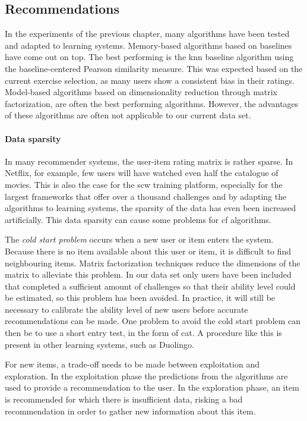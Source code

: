 \subsection{Recommendations}

In the experiments of the previous chapter, many algorithms have been tested and adapted to learning systems.
Memory-based algorithms based on baselines have come out on top.
The best performing is the \gls{knn} baseline algorithm using the baseline-centered Pearson similarity measure.
This was expected based on the current exercise selection, as many users show a consistent bias in their ratings.
Model-based algorithms based on dimensionality reduction through matrix factorization, are often the best performing algorithms.
However, the advantages of these algorithms are often not applicable to our current data set.

\paragraph{Data sparsity}
In many recommender systems, the user-item rating matrix is rather sparse.
In Netflix, for example, few users will have watched even half the catalogue of movies.
This is also the case for the \gls{scw} training platform, especially for the largest frameworks that offer over a thousand challenges and by adapting the algorithms to learning systems, the sparsity of the data has even been increased artificially.
This data sparsity can cause some problems for \gls{cf} algorithms.

The \emph{cold start problem} occurs when a new user or item enters the system.
Because there is no item available about this user or item, it is difficult to find neighbouring items.
Matrix factorization techniques reduce the dimensions of the matrix to alleviate this problem.
In our data set only users have been included that completed a sufficient amount of challenges so that their ability level could be estimated, so this problem has been avoided.
In practice, it will still be necessary to calibrate the ability level of new users before accurate recommendations can be made.
One problem to avoid the cold start problem can then be to use a short entry test, in the form of \gls{cat}.
A procedure like this is present in other learning systems, such as Duolingo.

For new items, a trade-off needs to be made between exploitation and exploration.
In the exploitation phase the predictions from the algorithms are used to provide a recommendation to the user.
In the exploration phase, an item is recommended for which there is insufficient data, risking a bad recommendation in order to gather new information about this item.

